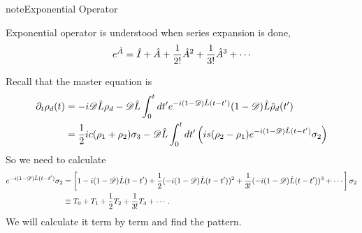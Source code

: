\documentclass[letterpaper,12pt,english]{sphinxmanual}
\begin{document}
\begin{notice}{note}{Exponential Operator}

Exponential operator is understood when series expansion is done,
\begin{gather}
\begin{split}e^{\hat A} = \hat I + \hat A + \frac{1}{2!}{\hat A}^2 + \frac{1}{3!} {\hat A}^3 +\cdots\end{split}\notag
\end{gather}\end{notice}

Recall that the master equation is
\begin{gather}
\begin{split}\partial_t \rho_d(t) &= - i \mathscr D \hat L \rho_d - \mathscr D\hat L \int_0^t dt' e^{-i(1-\mathscr D)\hat L (t-t')} (1-\mathscr D) \hat L \hat \rho_d(t') \\
& = \frac{1}{2}ic(\rho_1+\rho_2)\sigma_3 - \mathscr D\hat L \int_0^t dt' \left( i s (\rho_2-\rho_1) e^{-i(1-\mathscr D)\hat L (t-t')} \sigma_2  \right) \\\end{split}\notag
\end{gather}
So we need to calculate
\begin{gather}
\begin{split}e^{-i(1-\mathscr D)\hat L (t-t')} \sigma_2 &= \left[1 -i(1-\mathscr D)\hat L (t-t')  + \frac{1}{2} (-i(1-\mathscr D)\hat L (t-t') )^2 + \frac{1}{3!}(-i(1-\mathscr D)\hat L (t-t') )^3 + \cdots \right]\sigma_2\\
&\equiv T_0 + T_1 + \frac{1}{2} T_2 +  \frac{1}{3!}T_3 + \cdots .\end{split}\notag
\end{gather}
We will calculate it term by term and find the pattern.
\end{document}

